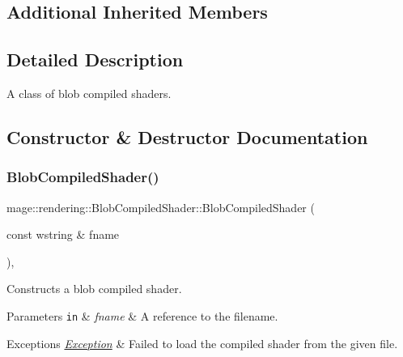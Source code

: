 \subsection*{Additional Inherited Members}


\subsection{Detailed Description}
A class of blob compiled shaders. 

\subsection{Constructor \& Destructor Documentation}
\hypertarget{classmage_1_1rendering_1_1_blob_compiled_shader_a9e29ef4b735ae26f6902077d9e7c4f1d}{}\label{classmage_1_1rendering_1_1_blob_compiled_shader_a9e29ef4b735ae26f6902077d9e7c4f1d} 
\subsubsection{\texorpdfstring{Blob\+Compiled\+Shader()}{BlobCompiledShader()}\hspace{0.1cm}{\footnotesize\ttfamily [1/3]}}
{\footnotesize\ttfamily mage\+::rendering\+::\+Blob\+Compiled\+Shader\+::\+Blob\+Compiled\+Shader (\begin{DoxyParamCaption}\item[{const wstring \&}]{fname }\end{DoxyParamCaption})\hspace{0.3cm}{\ttfamily [explicit]}, {\ttfamily [noexcept]}}

Constructs a blob compiled shader.


\begin{DoxyParams}[1]{Parameters}
\mbox{\tt in}  & {\em fname} & A reference to the filename. \\
\hline
\end{DoxyParams}

\begin{DoxyExceptions}{Exceptions}
{\em \hyperlink{classmage_1_1_exception}{Exception}} & Failed to load the compiled shader from the given file. \\
\hline
\end{DoxyExceptions}
\hypertarget{classmage_1_1rendering_1_1_blob_compiled_shader_a7b63a87261abf6059c957af4061af201}{}\label{classmage_1_1rendering_1_1_blob_compiled_shader_a7b63a87261abf6059c957af4061af201} 
